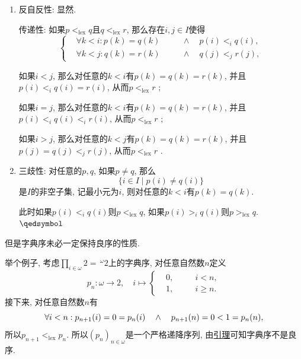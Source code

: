 \documentclass[UTF8]{ctexart}
\begin{document}
\begin{enumerate}
    \item 反自反性: 显然.
    
    \hspace{2.17em}
    传递性: 如果$p<_{\mathrm{lex}}q$且$q<_{\mathrm{lex}}r$, 那么存在$i,j\in I$使得
    \vspace{3pt}
    \[\left\{\begin{aligned}
        &\forall k<i:p(k)=q(k)&&\quad\land\quad p(i)<_iq(i),\\[-3pt]
        &\forall k<j:q(k)=r(k)&&\quad\land\quad q(j)<_jr(j),
    \end{aligned}\right.\]
    
    \vspace{3pt}\hspace{2.17em}
    如果$i<j$, 那么对任意的$k<i$有$p(k)=q(k)=r(k)$,
    并且$p(i)<_iq(i)=r(i)$, 从而$p<_{\mathrm{lex}}r$ ;

    \hspace{2.17em}
    如果$i=j$, 那么对任意的$k<i$有$p(k)=q(k)=r(k)$,
    并且$p(i)<_iq(i)<_ir(i)$, 从而$p<_{\mathrm{lex}}r$ ;

    \hspace{2.17em}
    如果$i>j$, 那么对任意的$k<j$有$p(k)=q(k)=r(k)$,
    并且$p(j)=q(j)<_jr(j)$, 从而$p<_{\mathrm{lex}}r$ .

    \item 三歧性: 对任意的$p,q$, 如果$p\neq q$, 那么
    \[
        \{i\in I\mid p(i)\neq q(i)\}
    \]
    是$I$的非空子集, 记最小元为$i$, 则对任意的$k<i$有$p(k)=q(k)$.

    \hspace{2.17em}
    此时如果$p(i)<_iq(i)$则$p<_{\mathrm{lex}}q$,
    如果$p(i)>_iq(i)$则$p>_{\mathrm{lex}}q$. \hfill $\qedsymbol$
\end{enumerate}

\vspace{10pt}

但是字典序未必一定保持良序的性质.

举个例子, 考虑$\displaystyle\prod_{i\in\omega}2=\,\!^\omega2$上的字典序,
对任意自然数$n$定义
\vspace{-3pt}
\[
    p_n:\omega\to 2,\quad i\mapsto\left\{\begin{aligned}
        &0,\quad&&i<n,\\[-3pt]
        &1,\quad&&i\geqslant n.
    \end{aligned}\right.
\]
接下来, 对任意自然数$n$有
\[
    \forall i<n:p_{n+1}(i)=0=p_n(i)\quad\land\quad p_{n+1}(n)=0<1=p_n(n),\\[3pt]
\]
所以$p_{n+1}<_{\mathrm{lex}}p_n$. 所以$(p_n)_{n\in\omega}$是一个严格递降序列,
由\href{04 良序关系#nameddest=sec:定理1.2}{引理}可知字典序不是良序.
\end{document}
